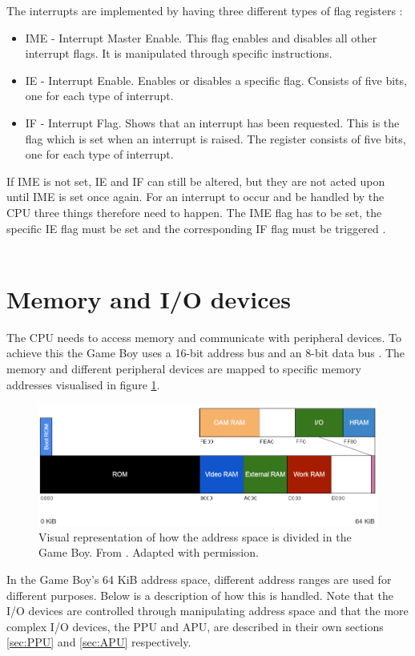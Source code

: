 The interrupts are implemented by having three different types of flag registers \cite{pandocsinterrupts}:
\begin{itemize}
    \item IME - Interrupt Master Enable. This flag enables and disables all other interrupt flags. It is manipulated through specific instructions.
    \item IE - Interrupt Enable. Enables or disables a specific flag. Consists of five bits, one for each type of interrupt.
    \item IF - Interrupt Flag. Shows that an interrupt has been requested. This is the flag which is set when an interrupt is raised. The register consists of five bits, one for each type of interrupt.
    \\
\end{itemize}
If IME is not set, IE and IF can still be altered, but they are not acted upon until IME is set once again. For an interrupt to occur and be handled by the CPU three things therefore need to happen. The IME flag has to be set, the specific IE flag must be set and the corresponding IF flag must be triggered \cite{pandocsinterrupts}. 
\\\\
\section{Memory and I/O devices}
The CPU needs to access memory and communicate with peripheral devices. To achieve this the Game Boy uses a 16-bit address bus and an 8-bit data bus \cite{TCAGBD}. The memory and different peripheral devices are mapped to specific memory addresses visualised in figure \ref{fig:memory-map}.


\begin{figure}[H]
    \centering
    \includegraphics[width=\textwidth]{figures/Memory Map.PNG}
    \caption{Visual representation of how the address space is divided in the Game Boy. From \cite{ultimateGBtalkSlides}. Adapted with permission.}
    \label{fig:memory-map}
\end{figure}
In the Game Boy's 64 KiB address space, different address ranges are used for different purposes. Below is a description of how this is handled. Note that the I/O devices are controlled through manipulating address space and that the more complex I/O devices, the PPU and APU, are described in their own sections \ref{sec:PPU} and \ref{sec:APU} respectively.

